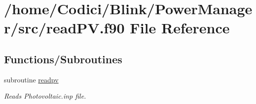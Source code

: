 \hypertarget{read_p_v_8f90}{\section{/home/\-Codici/\-Blink/\-Power\-Manager/src/read\-P\-V.f90 File Reference}
\label{read_p_v_8f90}
}
\subsection*{Functions/\-Subroutines}
\begin{DoxyCompactItemize}
\item 
subroutine \hyperlink{read_p_v_8f90_a7da992fc3763c23a4450ff04eb2e49e8}{readpv}
\begin{DoxyCompactList}\small\item\em Reads Photovoltaic.\-inp file. \end{DoxyCompactList}\end{DoxyCompactItemize}


